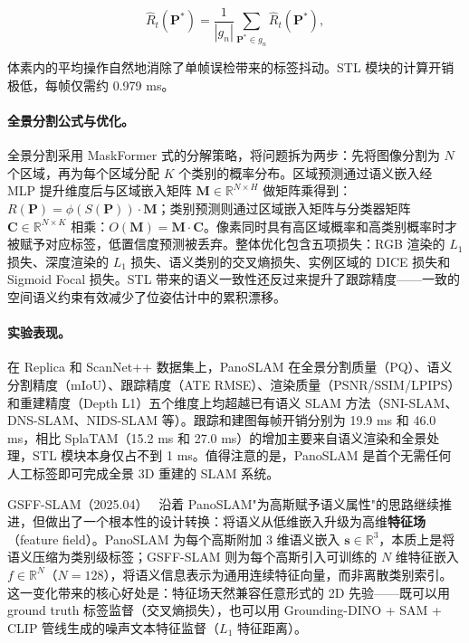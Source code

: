 \begin{equation*}
\hat{R}_t(\mathbf{P}^*) = \frac{1}{|g_n|}\sum_{\mathbf{P}^* \in g_n} \hat{R}_t(\mathbf{P}^*),
\end{equation*}

体素内的平均操作自然地消除了单帧误检带来的标签抖动。STL 模块的计算开销极低，每帧仅需约 0.979 ms。

\paragraph{全景分割公式与优化。}
全景分割采用 MaskFormer 式的分解策略，将问题拆为两步：先将图像分割为 $N$ 个区域，再为每个区域分配 $K$ 个类别的概率分布。区域预测通过语义嵌入经 MLP 提升维度后与区域嵌入矩阵 $\mathbf{M} \in \mathbb{R}^{N \times H}$ 做矩阵乘得到：$R(\mathbf{P}) = \phi(S(\mathbf{P})) \cdot \mathbf{M}$；类别预测则通过区域嵌入矩阵与分类器矩阵 $\mathbf{C} \in \mathbb{R}^{N \times K}$ 相乘：$O(\mathbf{M}) = \mathbf{M} \cdot \mathbf{C}$。像素同时具有高区域概率和高类别概率时才被赋予对应标签，低置信度预测被丢弃。整体优化包含五项损失：RGB 渲染的 $L_1$ 损失、深度渲染的 $L_1$ 损失、语义类别的交叉熵损失、实例区域的 DICE 损失和 Sigmoid Focal 损失。STL 带来的语义一致性还反过来提升了跟踪精度——一致的空间语义约束有效减少了位姿估计中的累积漂移。

\paragraph{实验表现。}
在 Replica 和 ScanNet++ 数据集上，PanoSLAM 在全景分割质量（PQ）、语义分割精度（mIoU）、跟踪精度（ATE RMSE）、渲染质量（PSNR/SSIM/LPIPS）和重建精度（Depth L1）五个维度上均超越已有语义 SLAM 方法（SNI-SLAM、DNS-SLAM、NIDS-SLAM 等）。跟踪和建图每帧开销分别为 19.9 ms 和 46.0 ms，相比 SplaTAM（15.2 ms 和 27.0 ms）的增加主要来自语义渲染和全景处理，STL 模块本身仅占不到 1 ms。值得注意的是，PanoSLAM 是首个无需任何人工标签即可完成全景 3D 重建的 SLAM 系统。

GSFF-SLAM（2025.04）~\cite{2504_19409} 沿着 PanoSLAM"为高斯赋予语义属性"的思路继续推进，但做出了一个根本性的设计转换：将语义从低维嵌入升级为高维\textbf{特征场}（feature field）。PanoSLAM 为每个高斯附加 3 维语义嵌入 $\mathbf{s} \in \mathbb{R}^3$，本质上是将语义压缩为类别级标签；GSFF-SLAM 则为每个高斯引入可训练的 $N$ 维特征嵌入 $f \in \mathbb{R}^N$（$N=128$），将语义信息表示为通用连续特征向量，而非离散类别索引。这一变化带来的核心好处是：特征场天然兼容任意形式的 2D 先验——既可以用 ground truth 标签监督（交叉熵损失），也可以用 Grounding-DINO + SAM + CLIP 管线生成的噪声文本特征监督（$L_1$ 特征距离）。

